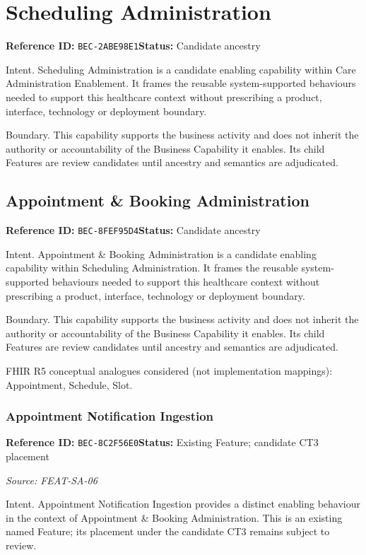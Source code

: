 \documentclass[11pt,a4paper,openany]{book}
\begin{document}
\section{Scheduling Administration}\label{cap:bec-2abe98e1}
\noindent\textbf{Reference ID:} \texttt{BEC-2ABE98E1}\quad \textbf{Status:} Candidate ancestry\par
Intent. Scheduling Administration is a candidate enabling capability within Care Administration Enablement. It frames the reusable system-supported behaviours needed to support this healthcare context without prescribing a product, interface, technology or deployment boundary.

Boundary. This capability supports the business activity and does not inherit the authority or accountability of the Business Capability it enables. Its child Features are review candidates until ancestry and semantics are adjudicated.

\subsection{Appointment \& Booking Administration}\label{cap:bec-8fef95d4}
\noindent\textbf{Reference ID:} \texttt{BEC-8FEF95D4}\quad \textbf{Status:} Candidate ancestry\par
Intent. Appointment \& Booking Administration is a candidate enabling capability within Scheduling Administration. It frames the reusable system-supported behaviours needed to support this healthcare context without prescribing a product, interface, technology or deployment boundary.

Boundary. This capability supports the business activity and does not inherit the authority or accountability of the Business Capability it enables. Its child Features are review candidates until ancestry and semantics are adjudicated.

FHIR R5 conceptual analogues considered (not implementation mappings): Appointment, Schedule, Slot.

\subsubsection{Appointment Notification Ingestion}\label{cap:bec-8c2f56e0}
\noindent\textbf{Reference ID:} \texttt{BEC-8C2F56E0}\quad \textbf{Status:} Existing Feature; candidate CT3 placement\par
\noindent\textit{Source: FEAT-SA-06}\par
Intent. Appointment Notification Ingestion provides a distinct enabling behaviour in the context of Appointment \& Booking Administration. This is an existing named Feature; its placement under the candidate CT3 remains subject to review.
\end{document}
